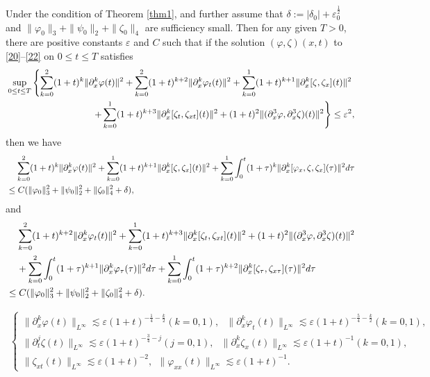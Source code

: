 \documentclass[10pt,a4paper]{amsart}
\begin{document}
	\begin{proposition}\label{p3.1}
		Under the condition of Theorem \ref{thm1},  and further assume that $\delta:=\left|\delta_{0}\right|+\varepsilon_0^{\frac{1}{2}}$ and $\|\varphi_{0}\|_{3}+\|\psi_{0}\|_{2}+\|\zeta_{0}\|_{4}$ are sufficiency small. 
		Then for any given $T>0$, there are positive constants $\varepsilon$ and $C$ such that if the solution $(\varphi, \zeta)(x, t)$ to \eqref{20}--\eqref{22} on $0\leq t\leq T$ satisfies
		\begin{align}\label{13.15}
		&\sup_{0\leq t\leq T}\left\{\sum_{k=0}^{2}(1+t)^{k}\|\partial_x^k\varphi(t)\|^2+\sum_{k=0}^{2}(1+t)^{k+2}\|\partial_x^k\varphi_t(t)\|^2+\sum_{k=0}^{1}(1+t)^{k+1}\|\partial_x^k[\zeta,\zeta_x](t)\|^2\notag\right.\\ 
		&\ \ \ \ \ \ \ \ \ \ \ \ \ \ \ \ \ \ \ \ \ \ \ \ \ \ \ \ \left.+\sum_{k=0}^{1}(1+t)^{k+3}\|\partial_x^k[\zeta_t,\zeta_{xt}](t)\|^2+(1+t)^{2}\|(\partial_x^3\varphi,\partial_x^3\zeta)(t)\|^2\right\}\leq \varepsilon^2,
		\end{align}
		then we have
		\begin{align}\label{13.16}
			&\;\;\;\;\sum_{k=0}^{2}(1+t)^{k}\|\partial_x^k\varphi(t)\|^2+\sum_{k=0}^{1}(1+t)^{k+1}\|\partial_x^k[\zeta,\zeta_x](t)\|^2+\sum_{k=0}^{1}\int_{0}^{t}(1+\tau)^k\|\partial_x^k[\varphi_x,\zeta,\zeta_x](\tau)\|^2{\rm d}\tau\notag\\
			&\leq C(\|\varphi_0\|_3^2+\|\psi_0\|_2^2+\|\zeta_0\|_4^2+\delta),
		\end{align}
		and
		\begin{align}\label{13.17}
			&\;\;\;\;\sum_{k=0}^{2}(1+t)^{k+2}\|\partial_x^k\varphi_t(t)\|^2+\sum_{k=0}^{1}(1+t)^{k+3}\|\partial_x^k[\zeta_t,\zeta_{xt}](t)\|^2+(1+t)^{2}\|(\partial_x^3\varphi,\partial_x^3\zeta)(t)\|^2\notag\\
			&\;\;\;\;+\sum_{k=0}^{2}\int_{0}^{t}(1+\tau)^{k+1}\|\partial_x^k\varphi_{\tau}(\tau)\|^2{\rm d}\tau+\sum_{k=0}^{1}\int_{0}^{t}(1+\tau)^{k+2}\|\partial_x^k[\zeta_{\tau},\zeta_{x\tau}](\tau)\|^2{\rm d}\tau\notag\\
			&\leq C(\|\varphi_0\|_3^2+\|\psi_0\|_2^2+\|\zeta_0\|_4^2+\delta).
		\end{align}
	\end{proposition}

	\begin{align}\label{13.18}
		\left\{
		\begin{array}{lr}
		\|\partial_x^k\varphi(t)\|_{L^{\infty}}\lesssim\varepsilon(1+t)^{-\frac{1}{4}-\frac{k}{2}} (k=0,1),\ \ \ \|\partial_x^k\varphi_t(t)\|_{L^{\infty}}\lesssim\varepsilon(1+t)^{-\frac{5}{4}-\frac{k}{2}}(k=0,1),\\[2mm]
			\|\partial_t^j\zeta(t)\|_{L^{\infty}}\lesssim\varepsilon(1+t)^{-\frac{3}{4}-j} (j=0,1),\ \ \ \|\partial_x^k\zeta_x(t)\|_{L^{\infty}}\lesssim\varepsilon(1+t)^{-1} (k=0,1),\\[2mm]
			\|\zeta_{xt}(t)\|_{L^{\infty}}\lesssim\varepsilon(1+t)^{-2},\ \  \|\varphi_{xx}(t)\|_{L^{\infty}}\lesssim\varepsilon(1+t)^{-1}. 
		\end{array}
		\right.
	\end{align}
\end{document}

